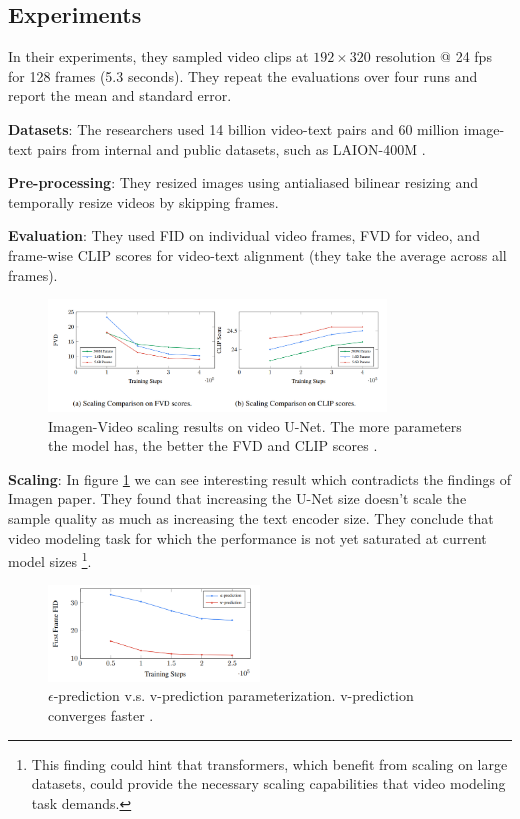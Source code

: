 \subsection{Experiments}

In their experiments, they sampled video clips at $192\times 320$ resolution @ 24 fps for 128 frames (5.3 seconds). They repeat the evaluations over four runs and report the mean and standard error.

\textbf{Datasets}: The researchers used 14 billion video-text pairs and 60 million image-text pairs from internal and public datasets, such as LAION-400M \cite{laion_400m}.

\textbf{Pre-processing}: They resized images using antialiased bilinear resizing and temporally resize videos by skipping frames.

\textbf{Evaluation}: They used FID on individual video frames, FVD for video, and frame-wise CLIP scores for video-text alignment (they take the average across all frames).

\begin{figure}
    \centering
    \includegraphics[width=0.8\textwidth]{images/imagen_video/scaling.png}
    \caption{Imagen-Video scaling results on video U-Net. The more parameters the model has, the better the FVD and CLIP scores \cite{imagen_video}.}
    \label{fig:imagen_video_scaling}
\end{figure}

\textbf{Scaling}: In figure \ref{fig:imagen_video_scaling} we can see interesting result which contradicts the findings of Imagen \cite{imagen} paper. They found that increasing the U-Net size doesn't scale the sample quality as much as increasing the text encoder size. They conclude that video modeling task for which the performance is not yet saturated at current model sizes \footnote{This finding could hint that transformers, which benefit from scaling on large datasets, could provide the necessary scaling capabilities that video modeling task demands.}.

\begin{figure}
    \centering
    \includegraphics[width=0.5\textwidth]{images/imagen_video/e_prediction_vs_v_prediction_2.png}
    \caption{$\epsilon$-prediction v.s. v-prediction parameterization. v-prediction converges faster \cite{imagen_video}.}
\end{figure}

